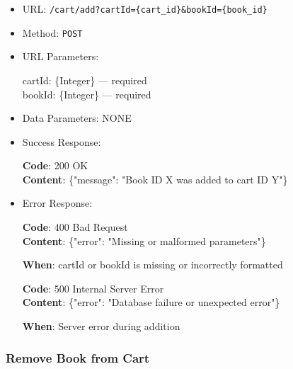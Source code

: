 \begin{itemize}
    \item URL: \texttt{/cart/add?cartId=\{cart\_id\}&bookId=\{book\_id\}}
    \item Method: \texttt{POST}
    \item URL Parameters:

    cartId: \{Integer\} — required \\
    bookId: \{Integer\} — required

    \item Data Parameters: NONE

    \item Success Response: \newline

    \textbf{Code}: 200 OK \\
    \textbf{Content}: \{"message": "Book ID X was added to cart ID Y"\}

    \item Error Response: \newline

    \textbf{Code}: 400 Bad Request \\
    \textbf{Content}: \{"error": "Missing or malformed parameters"\}

    \textbf{When}: cartId or bookId is missing or incorrectly formatted \newline

    \textbf{Code}: 500 Internal Server Error \\
    \textbf{Content}: \{"error": "Database failure or unexpected error"\}

    \textbf{When}: Server error during addition
\end{itemize}

\subsubsection*{Remove Book from Cart}

